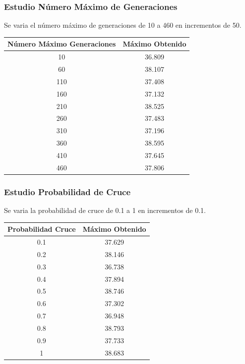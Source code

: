 \documentclass[12pt]{article}
\begin{document}
\subsubsection*{Estudio Número Máximo de Generaciones}
	Se varia el número máximo de generaciones de 10 a 460 en incrementos de 50.
\begin{table}[H]
\begin{center}
\begin{tabular}{|cc|} \hline
Número Máximo Generaciones & Máximo Obtenido \\  \hline
10  & 36.809 \\ 
60  & 38.107 \\ 
110 & 37.408 \\
160 & 37.132 \\
210 & 38.525 \\
260 & 37.483 \\
310 & 37.196 \\
360 & 38.595 \\ 
410 & 37.645 \\
460 & 37.806 \\  \hline
\end{tabular}
\end{center}
\end{table}
\subsubsection*{Estudio Probabilidad de Cruce}
	Se varia la probabilidad de cruce de 0.1 a 1 en incrementos de 0.1.
\begin{table}[H]
\begin{center}
\begin{tabular}{|cc|} \hline
Probabilidad Cruce & Máximo Obtenido \\  \hline
0.1 & 37.629 \\ 
0.2 & 38.146 \\ 
0.3 & 36.738 \\
0.4 & 37.894 \\
0.5 & 38.746 \\
0.6 & 37.302 \\
0.7 & 36.948 \\
0.8 & 38.793 \\ 
0.9 & 37.733 \\
1   & 38.683 \\  \hline
\end{tabular}
\end{center}
\end{table}
\end{document}
